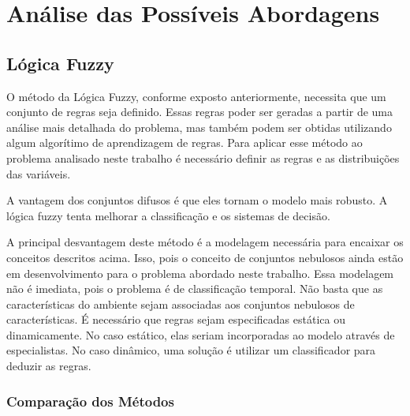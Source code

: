 \chapter{Análise das Possíveis Abordagens}\label{cap:anal_abordagens}



\section{Lógica Fuzzy}


O método da Lógica Fuzzy, conforme exposto anteriormente, necessita que um
conjunto de regras seja definido. Essas regras poder ser geradas a partir de uma
análise mais detalhada do problema, mas também podem ser obtidas utilizando
algum algorítimo de aprendizagem de regras. Para aplicar esse método ao problema
analisado neste trabalho é necessário definir as regras e as distribuições das
variáveis.

A vantagem dos conjuntos difusos é que eles tornam o modelo mais robusto. A
lógica fuzzy tenta melhorar a classificação e os sistemas de decisão.

A principal desvantagem deste método é a modelagem necessária para encaixar os
conceitos descritos acima. Isso, pois o conceito de conjuntos nebulosos ainda
estão em desenvolvimento para o problema abordado neste trabalho. Essa modelagem
não é imediata, pois o problema é de classificação temporal. Não basta que as
características do ambiente sejam associadas aos conjuntos nebulosos de
características. É necessário que regras sejam especificadas estática ou
dinamicamente. No caso estático, elas seriam incorporadas ao modelo através de
especialistas. No caso dinâmico, uma solução é utilizar um classificador para
deduzir as regras.

\subsection{Comparação dos Métodos}

